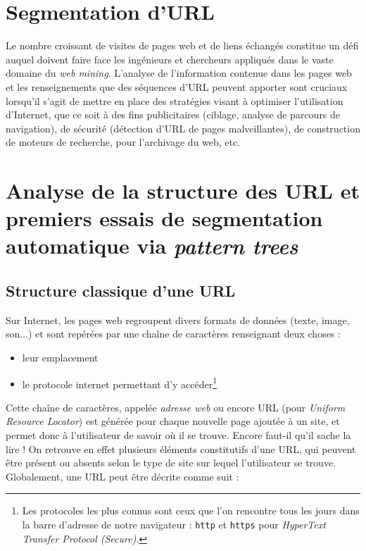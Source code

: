 \documentclass[11pt, a4paper]{article}
\begin{document}
\section{Segmentation d'URL}

Le nombre croissant de visites de pages web et de liens échangés constitue un défi auquel doivent faire face les ingénieurs et chercheurs appliqués dans le vaste domaine du \textit{web mining}. L'analyse de l'information contenue dans les pages web et les renseignements que des séquences d'URL peuvent apporter sont cruciaux lorsqu'il s'agit de mettre en place des stratégies visant à optimiser l'utilisation d'Internet, que ce soit à des fins publicitaires (ciblage, analyse de parcours de navigation), de sécurité (détection d'URL de pages malveillantes), de construction de moteurs de recherche, pour l'archivage du web, etc.

\section{Analyse de la structure des URL et premiers essais de segmentation automatique via \textit{pattern trees}}

\subsection{Structure classique d'une URL}

Sur Internet, les pages web regroupent divers formats de données (texte, image, son...) et sont repérées par une chaîne de caractères renseignant deux choses :
\begin{itemize}
	\item leur emplacement
	\item le protocole internet permettant d'y accéder\footnote{Les protocoles les plus connus sont ceux que l'on rencontre tous les jours dans la barre d'adresse de notre navigateur : \texttt{http} et \texttt{https} pour \textit{HyperText Transfer Protocol (Secure)}.}
\end{itemize}

Cette chaîne de caractères, appelée \textit{adresse web} ou encore URL (pour \textit{Uniform Resource Locator}) est générée pour chaque nouvelle page ajoutée à un site, et permet donc à l'utilisateur de savoir où il se trouve. Encore faut-il qu'il sache la lire ! On retrouve en effet plusieurs éléments constitutifs d'une URL, qui peuvent être présent ou absents selon le type de site sur lequel l'utilisateur se trouve. Globalement, une URL peut être décrite comme suit :
\end{document}
